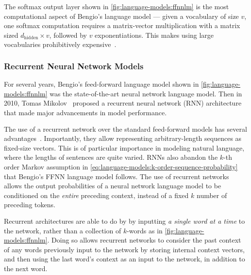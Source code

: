 The softmax output layer shown in \autoref{fig:language-models:ffnnlm} is the most computational aspect of Bengio's language model ---
given a vocabulary of size $v$, one softmax computation requires a matrix-vector multiplication with a matrix sized $d_\text{hidden} \times v$, followed by $v$ exponentiations.
This makes using large vocabularies prohibitively expensive~\cite{goldberg_2017}.

\subsubsection{Recurrent Neural Network Models}\label{sec:language-models:rnns}

For several years, Bengio's feed-forward language model shown in \autoref{fig:language-models:ffnnlm} was the state-of-the-art neural network language model.
Then in 2010, Tomas Mikolov~\cite{Mikolov2010RecurrentNN,Mikolov2011RecurrentNN,Mikolov2012ContextDR} proposed a recurrent neural network (RNN) architecture that made major advancements in model performance.

The use of a recurrent network over the standard feed-forward models has several advantages~\cite{goldberg_2017}.
Importantly, they allow representing arbitrary-length sequences as fixed-size vectors.
This is of particular importance in modeling natural language, where the lengths of sentences are quite varied.
RNNs also abandon the $k$-th order Markov assumption in \autoref{eq:language-models:k-order-sequence-probability} that Bengio's FFNN language model follows.
The use of recurrent networks allows the output probabilities of a neural network language model to be conditioned on the \textit{entire} preceding context, instead of a fixed $k$ number of preceding tokens.

Recurrent architectures are able to do by by inputting \textit{a single word at a time} to the network, rather than a collection of $k$-words as in \autoref{fig:language-models:ffnnlm}.
Doing so allows recurrent networks to consider the past context of any words previously input to the network by storing internal context vectors, and then using the last word's context as an input to the network, in addition to the next word.

